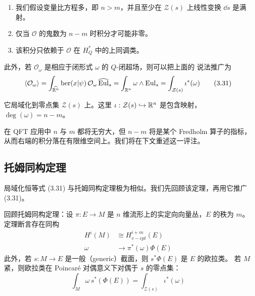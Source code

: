 \begin{enumerate}
\item 我们假设变量比方程多，即 $n>m$，并且至少在 $\mathcal Z(s)$ 上线性变换 $\dd s$
  是满射。
\item 仅当 $\mathcal O$ 的鬼数为 $n-m$ 时积分才可能非零。
\item 该积分只依赖于 $\mathcal O$ 在 $H^{\ast}_Q$ 中的上同调类。
\end{enumerate}

此外，若 $\mathcal O_\omega$ 是相应于闭形式 $\omega$ 的 $Q$-闭超场，则可以把上面的
说法推广为
\begin{equation}
\langle\mathcal O_\omega\rangle
= \int_{\widehat{\mathbb{R}^n}}\mathrm{ber}(x|\psi)\,\mathcal O_\omega\,
\widehat{\mathrm{Eul}}_s
= \int_{\mathbb{R}^n}\omega\wedge\mathrm{Eul}_s
= \int_{\mathcal Z(s)}\iota^{\ast}(\omega)
\tag{3.31}
\end{equation}

它局域化到零点集 $\mathcal Z(s)$ 上。这里 $\iota:\mathcal Z(s)\hookrightarrow\mathbb{R}^n$
是包含映射，$\deg(\omega)=n-m$。

在 QFT 应用中 $n$ 与 $m$ 都将无穷大，但 $n-m$ 将是某个 Fredholm 算子的指标，
从而右端的积分落在有限维空间上。我们将在下文重述这一评注。

\subsection{托姆同构定理}

局域化恒等式 (3.31) 与托姆同构定理极为相似。我们先回顾该定理，再用它推广 (3.31)。

回顾托姆同构定理：设 $\pi:E\to M$ 是 $n$ 维流形上的实定向向量丛，$E$ 的秩为 $m$。
定理断言存在同构
\begin{align}
H^i(M) &\cong H^{i+m}_{v-cpt}(E) \tag{3.32}\\
\omega &\to \pi^{\ast}(\omega)\Phi(E) \tag{3.33}
\end{align}
此外，若 $s:M\to E$ 是一般（generic）截面，则 $s^{\ast}\Phi(E)$ 是 $E$ 的欧拉类。
若 $M$ 紧，则欧拉类在 Poincar\'e 对偶意义下对偶于 $s$ 的零点集：
\begin{equation}
\int_M\omega\,s^{\ast}(\Phi(E)) = \int_{\mathcal Z(s)}\iota^{\ast}(\omega)
\tag{3.34}
\end{equation}

